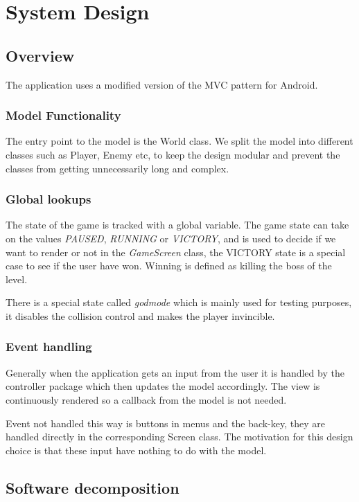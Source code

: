 \documentclass{article}
\begin{document}
\section{System Design}
\subsection{Overview}
The application uses a modified version of the MVC pattern for Android.

\subsubsection{Model Functionality}
The entry point to the model is the World class. We split the model into different classes such as Player, Enemy etc, to keep the design modular and prevent the classes from getting unnecessarily long and complex.

\subsubsection{Global lookups}
The state of the game is tracked with a global variable. The game state can take on the values \textit{PAUSED}, \textit{RUNNING} or \textit{VICTORY}, and is used to decide if we want to render or not in the \textit{GameScreen} class, the VICTORY state is a special case to see if the user have won. Winning is defined as killing the boss of the level. 
 
There is a special state called \textit{godmode} which is mainly used for testing purposes, it disables the collision control and makes the player invincible.
    
\subsubsection{Event handling}
Generally when the application gets an input from the user it is handled by the controller package which then updates the model accordingly. The view is continuously rendered so a callback from the model is not needed.

Event not handled this way is buttons in menus and the back-key, they are handled directly in the corresponding Screen class. The motivation for this design choice is that these input have nothing to do with the model.

\subsection{Software decomposition}
\end{document}
